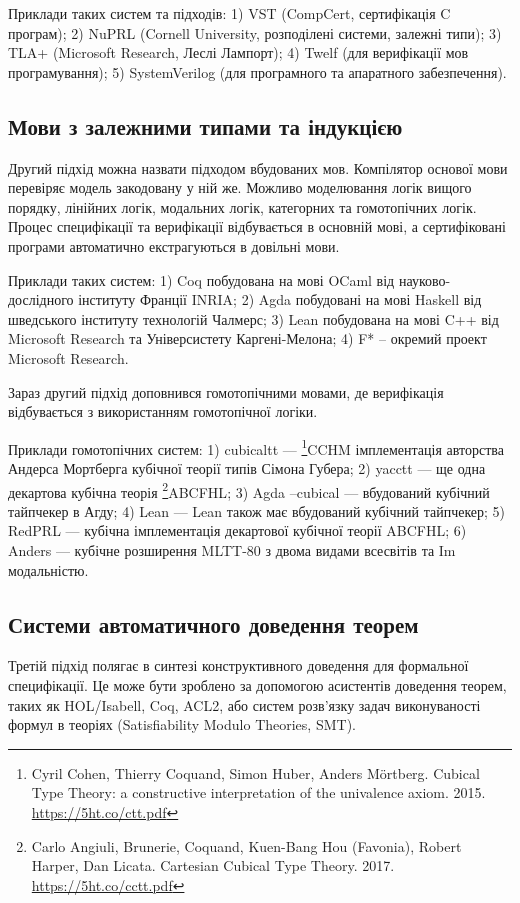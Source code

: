 Приклади таких систем та підходів:
1) VST (CompCert, сертифікація C програм);
2) NuPRL (Cornell University, розподілені системи, залежні типи);
3) TLA+ (Microsoft Research, Леслі Лампорт);
4) Twelf (для верифікації мов програмування);
5) SystemVerilog (для програмного та апаратного забезпечення).

\subsection{Мови з залежними типами та індукцією}
Другий підхід можна назвати підходом вбудованих мов.
Компілятор основої мови перевіряє модель закодовану у ній же. Можливо моделювання
логік вищого порядку, лінійних логік, модальних логік, категорних та гомотопічних логік.
Процес специфікації та верифікації відбувається в основній мові, а сертифіковані програми
автоматично екстрагуються в довільні мови.

Приклади таких систем:
1) Coq побудована на мові OCaml від науково-дослідного інституту Франції INRIA;
2) Agda побудовані на мові Haskell від шведського інституту технологій Чалмерс;
3) Lean побудована на мові C++ від Microsoft Research та Універсистету Каргені-Мелона;
4) F* -- окремий проект Microsoft Research.

Зараз другий підхід доповнився гомотопічними мовами, де верифікація відбувається
з використанням гомотопічної логіки.

Приклади гомотопічних систем:
1) cubicaltt --- \footnote{Cyril Cohen, Thierry Coquand, Simon Huber, Anders M{\"{o}}rtberg. Cubical Type Theory: a constructive interpretation of the univalence axiom. 2015. \url{https://5ht.co/ctt.pdf}}{CCHM} імплементація авторства Андерса Мортберга кубічної теорії типів Сімона Губера;
2) yacctt --- ще одна декартова кубічна теорія \footnote{Carlo Angiuli, Brunerie, Coquand, Kuen-Bang Hou (Favonia), Robert Harper, Dan Licata. Cartesian Cubical Type Theory. 2017. \url{https://5ht.co/cctt.pdf}}{ABCFHL};
3) Agda --cubical --- вбудований кубічний тайпчекер в Агду;
4) Lean --- Lean також має вбудований кубічний тайпчекер;
5) RedPRL --- кубічна імплементація декартової кубічної теорії ABCFHL;
6) Anders --- кубічне розширення MLTT-80 з двома видами всесвітів та Im модальністю.

\subsection{Системи автоматичного доведення теорем}
Третій підхід полягає в синтезі конструктивного доведення
для формальної специфікації. Це може бути зроблено за
допомогою асистентів доведення теорем, таких як HOL/Isabell, Coq, ACL2,
або систем розв'язку задач виконуваності формул в теоріях (Satisfiability
Modulo Theories, SMT).

